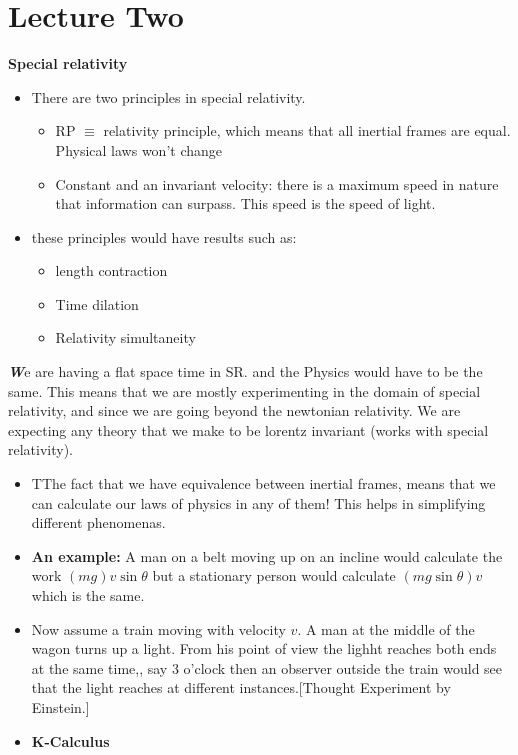 \documentclass[10pt,a4paper,twocolumn]{article}
\newcounter{theo}
\newenvironment{callout}
	{\begin{calloutbox}\color{charcoal}\textbf\textit}
	{\end{calloutbox}}
\begin{document}
    \section{Lecture Two}
        \textbf{Special relativity}
        \begin{itemize}
            \item There are two principles in special relativity.
            \begin{itemize}
                \item RP $\equiv$ relativity principle, which means that all inertial frames are equal. Physical laws won't change
                \item Constant and an invariant velocity: there is a maximum speed in nature that information can surpass. This speed is the speed of light.
            \end{itemize}  
            \item these principles would have results such as: 
            \begin{itemize}
                \item length contraction
                \item Time dilation
                \item Relativity simultaneity
            \end{itemize}
        \end{itemize}
        \begin{callout}
            We are having a flat space time in SR. and the Physics would have to be the same. This means that we are mostly experimenting in the domain of special relativity, and since we are going beyond the newtonian relativity. We are expecting any theory that we make to be lorentz invariant (works with special relativity).
        \end{callout}
        \begin{itemize}
            \item TThe fact that we have equivalence between inertial frames, means that we can calculate our laws of physics in any of them! This helps in simplifying different phenomenas.
            \item \textbf{An example:} A man on a belt moving up on an incline would calculate the work $(mg)v\sin\theta$ but a stationary person would calculate $(mg\sin\theta)v$ which is the same.
            \item Now assume a train moving with velocity $v$. A man at the middle of the wagon turns up a light. From his point of view the lighht reaches both ends at the same time,, say $3$ o'clock then an observer outside the train would see that the light reaches at different instances.[Thought Experiment by Einstein.]
            \item \textbf{K-Calculus}
        \end{itemize}
\end{document}
